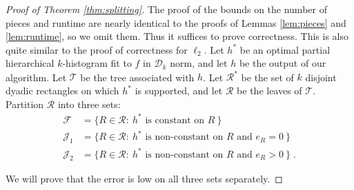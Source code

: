 \documentclass[final,12pt]{colt2018} %
\newcommand{\rect}{\mathcal{R}}
\newcommand{\hier}{\mathcal{D}}
\newcommand{\calT}{\mathcal{T}}
\newcommand{\calF}{\mathcal{F}}
\newcommand{\calJ}{\mathcal{J}}
\newcommand{\fhat}{\widehat{f}}
\begin{document}
\begin{proof}[Proof of Theorem \ref{thm:splitting}]
The proof of the bounds on the number of pieces and runtime are nearly identical to the proofs of Lemmas \ref{lem:pieces} and \ref{lem:runtime}, so we omit them.
Thus it suffices to prove correctness.
This is also quite similar to the proof of correctness for $\ell_2$.
Let $h^*$ be an optimal partial hierarchical $k$-histogram fit to $\fhat$ in $\hier_k$ norm, and let $h$ be the output of our algorithm.
Let $\calT$ be the tree associated with $h$.
Let $\rect^*$ be the set of $k$ disjoint dyadic rectangles on which $h^*$ is supported, and let $\rect$ be the leaves of $\calT$.
Partition $\rect$ into three sets: 
\begin{align*}
\calF &= \{ R \in \rect: ~\mbox{$h^*$ is constant on $R$}~\} \\
\calJ_1 &= \{ R \in \rect: ~\mbox{$h^*$ is non-constant on $R$ and $e_R = 0$}~\} \\
\calJ_2 &= \{ R \in \rect: ~\mbox{$h^*$ is non-constant on $R$ and $e_R > 0$}~\} \; .
\end{align*}

\noindent
We will prove that the error is low on all three sets separately.


\end{proof}
\end{document}
